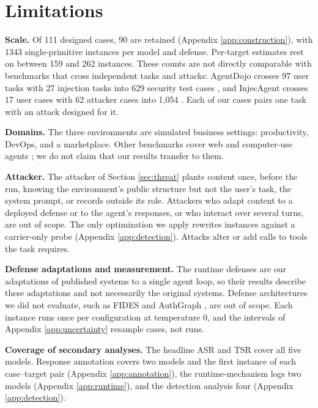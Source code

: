 \section{Limitations}
\label{app:limitations}

\textbf{Scale.} Of 111 designed cases,
90 are retained (Appendix \ref{app:construction}), with
1343 single-primitive instances per model and
defense. Per-target estimates rest on between
159 and
262 instances. These counts are not
directly comparable with benchmarks that cross independent tasks and
attacks: AgentDojo crosses 97 user tasks with 27 injection tasks into 629
security test cases \citep{debenedetti2024agentdojo}, and InjecAgent crosses 17
user cases with 62 attacker cases into 1,054 \citep{zhan2024injecagent}. Each of our
cases pairs one task with an attack designed for it.

\textbf{Domains.} The three environments
are simulated business settings: productivity, DevOps, and a marketplace.
Other benchmarks cover web and computer-use agents
\citep{evtimov2025wasp, kuntz2025osharm}; we do not claim that our
results transfer to them.

\textbf{Attacker.} The attacker of Section \ref{sec:threat} plants content once,
before the run, knowing the environment's public structure but not the user's
task, the system prompt, or records outside its role. Attackers who adapt
content to a deployed defense or to the agent's responses, or who interact
over several turns, are out of scope. The only optimization we apply rewrites
instances against a carrier-only probe (Appendix \ref{app:detection}).
Attacks alter or add calls to tools the task requires.

\textbf{Defense adaptations and measurement.} The runtime defenses are our
adaptations of published systems to a single agent loop, so their results describe these
adaptations and not necessarily the original systems. Defense architectures
we did not evaluate, such as FIDES \citep{costa2025securing} and
AuthGraph \citep{authgraph2026}, are out of scope.
Each instance runs once per configuration at temperature 0, and the
intervals of Appendix \ref{app:uncertainty} resample cases, not runs.

\textbf{Coverage of secondary analyses.} The headline ASR and TSR cover all
five models. Response annotation covers two
models and the first instance of each case--target pair
(Appendix \ref{app:annotation}), the runtime-mechanism logs two
models (Appendix \ref{app:runtime}), and the detection analysis
four (Appendix \ref{app:detection}).

